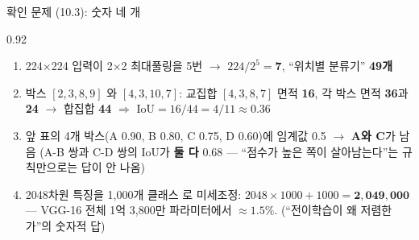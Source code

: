 \begin{frame}{확인 문제 (10.3): 숫자 네 개}
\begin{center}\begin{varwidth}{0.92\textwidth}
  \small
  \begin{enumerate}
    \item {} 224$\times$224 입력이 2$\times$2
      최대풀링을 5번 $\to$ $224/2^5 = \mathbf{7}$,
      ``위치별 분류기'' \textbf{49개}
    \item {} 박스 $[2,3,8,9]$ 와 $[4,3,10,7]$:
      교집합 $[4,3,8,7]$ 면적 \textbf{16}, 각 박스 면적
      \textbf{36}과 \textbf{24} $\to$ 합집합 \textbf{44}
      $\Rightarrow$ $\text{IoU} = 16/44 = 4/11 \approx
      \mathbf{0.36}$
    \item {} 앞 표의 4개 박스(A 0.90, B 0.80, C 0.75,
      D 0.60)에 임계값 0.5 $\to$ \textbf{A와 C}가 남음
      (A-B 쌍과 C-D 쌍의 IoU가 \textbf{둘 다} 0.68 ---
      ``점수가 높은 쪽이 살아남는다''는 규칙만으로는
      답이 안 나옴)
    \item {} 2048차원 특징을 1,000개 클래스
     로 미세조정: $2048\times1000+1000 = \mathbf{2{,}049{,}000}$
      --- VGG-16 전체 1억 3,800만 파라미터에서
      \textbf{$\approx 1.5\%$}. (``전이학습이 왜
      저렴한가''의 숫자적 답)
  \end{enumerate}
\end{varwidth}\end{center}
\end{frame}
